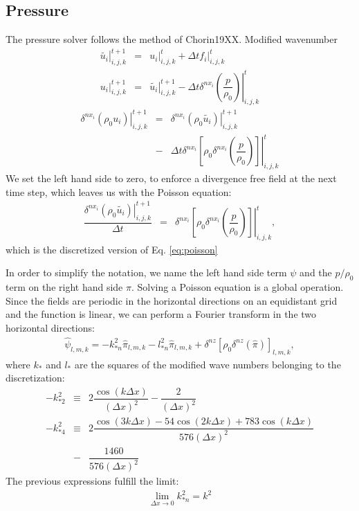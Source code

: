 \documentclass[gmd]{copernicus}
\begin{document}
\subsection{Pressure}
The pressure solver follows the method of Chorin19XX.
Modified wavenumber
\begin{eqnarray}
\left. \widetilde{u_i} \right|^{t+1}_{i,j,k} & = & \left. u_i \right|^{t}_{i,j,k} + \Delta t \left. f_i \right|^{t}_{i,j,k}\\
\left. u_i\right|^{t+1}_{i,j,k} & = & \left. \widetilde{u_i} \right|^{t+1}_{i,j,k} - \Delta t \left. \delta^{nx_i}\left( \dfrac{p}{\rho_0}\right)\right|^t_{i,j,k}
\end{eqnarray}
\begin{eqnarray}
\left. \delta^{nx_i} \left( \rho_0 u_i\right) \right|^{t+1}_{i,j,k} & = & 
\left. \delta^{nx_i} \left( \rho_0 \widetilde{u_i} \right) \right|^{t+1}_{i,j,k}\\
& - &  \Delta t \left.\delta^{nx_i} \left[ \rho_0 \delta^{nx_i}\left( \dfrac{p}{\rho_0}\right) \right] \right|^t_{i,j,k}
\end{eqnarray}
We set the left hand side to zero, to enforce a divergence free field at the next time step, which leaves us with the Poisson equation:
\begin{eqnarray}
\dfrac{\left. \delta^{nx_i} \left( \rho_0 \widetilde{u_i} \right) \right|^{t+1}_{i,j,k}}{\Delta t}
& = &  \left. \delta^{nx_i} \left[ \rho_0 \delta^{nx_i}\left( \dfrac{p}{\rho_0}\right) \right] \right|^t_{i,j,k},
\end{eqnarray}
which is the discretized version of Eq. \ref{eq:poisson}

In order to simplify the notation, we name the left hand side term $\psi$ and the $p / \rho_0$ term on the right hand side $\pi$. Solving a Poisson equation is a global operation. Since the fields are periodic in the horizontal directions on an equidistant grid and the function is linear, we can perform a Fourier transform in the two horizontal directions:
\begin{eqnarray}
\widehat{\psi}_{l,m,k} = - k^2_{*n} \widehat{\pi}_{l,m,k} - l^2_{*n} \widehat{\pi}_{l,m,k}
+ \delta^{nz} \left[ \rho_0 \delta^{nz} \left( \widehat{\pi} \right) \right]_{l,m,k},
\end{eqnarray}
where $k_*$ and $l_*$ are the squares of the modified wave numbers belonging to the discretization:
\begin{eqnarray}
-k_{*2}^2 & \equiv & 2 \dfrac{\cos (k \Delta x)}{\left( \Delta x \right)^2} - \dfrac{2}{\left( \Delta x \right)^2}\\
\nonumber
-k_{*4}^2 & \equiv & 2 \dfrac{\cos (3k \Delta x) - 54 \cos (2k \Delta x) + 783 \cos (k \Delta x)}
{576 \left( \Delta x \right)^2}\\
& - & \dfrac{1460}{576 \left( \Delta x \right)^2}
\end{eqnarray}
The previous expressions fulfill the limit:
\begin{eqnarray}
\lim_{\Delta x \rightarrow 0} k_{*n}^2 = k^2
\end{eqnarray}
\end{document}
